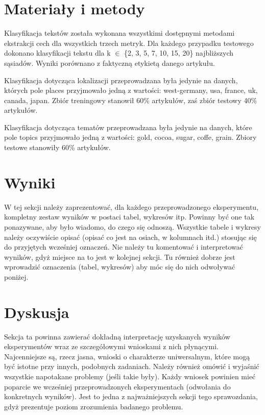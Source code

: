\documentclass{classrep}
\begin{document}
\section{Materiały i metody}
Klasyfikacja tekstów została wykonana wszystkimi dostępnymi metodami ekstrakcji cech dla wszystkich trzech metryk. Dla każdego przypadku testowego dokonano klasyfikacji tekstu dla k $\in$ \{2, 3, 5, 7, 10, 15, 20\} najbliższych sąsiadów. Wyniki porównano z faktyczną etykietą danego artykułu. \newline

Klasyfikacja dotycząca lokalizacji przeprowadzana była jedynie na danych, których pole places przyjmowało jedną z wartości: west-germany, usa, france, uk, canada, japan. Zbiór treningowy stanowił 60\% artykułów, zaś zbiór testowy 40\% artykułów. \newline

Klasyfikacja dotycząca tematów przeprowadzana była jedynie na danych, które pole topics przyjmowało jedną z wartości: gold, cocoa, sugar, coffe, grain. Zbiory testowe stanowiły 60\% artykułów. \newline


\section{Wyniki}

{\color{blue}
W tej sekcji należy zaprezentować, dla każdego przeprowadzonego eksperymentu,
kompletny zestaw wyników w postaci tabel, wykresów itp. Powinny być one tak
ponazywane, aby było wiadomo, do czego się odnoszą. Wszystkie tabele i wykresy
należy oczywiście opisać (opisać co jest na osiach, w kolumnach itd.) stosując
się do przyjętych wcześniej oznaczeń. Nie należy tu komentować i interpretować
wyników, gdyż miejsce na to jest w kolejnej sekcji. Tu również dobrze jest
wprowadzić oznaczenia (tabel, wykresów) aby móc się do nich odwoływać
poniżej.}

\section{Dyskusja}
{\color{blue}
Sekcja ta powinna zawierać dokładną interpretację uzyskanych wyników
eksperymentów wraz ze szczegółowymi wnioskami z nich płynącymi. Najcenniejsze
są, rzecz jasna, wnioski o charakterze uniwersalnym, które mogą być istotne
przy innych, podobnych zadaniach. Należy również omówić i wyjaśnić wszystkie
napotakane problemy (jeśli takie były). Każdy wniosek powinien mieć poparcie
we wcześniej przeprowadzonych eksperymentach (odwołania do konkretnych
wyników). Jest to jedna z najważniejszych sekcji tego sprawozdania, gdyż
prezentuje poziom zrozumienia badanego problemu.}
\end{document}
